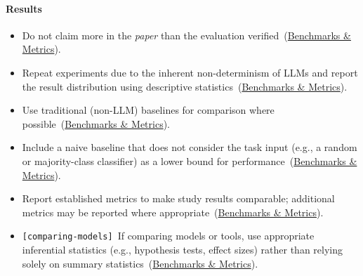\documentclass[smallextended]{svjour3}
\makeatletter
\newcommand{\must}{\textbf{must}\xspace}
\newcommand{\mustnot}{\textbf{must not}\xspace}
\newcommand{\should}{\textbf{should}\xspace}
\newcommand{\paper}{\emph{paper}\xspace}
\newcommand{\paper}{\emph{paper}\xspace}
\newcommand{\iconM}{\usebox{\iconMbox}\xspace}
\newcommand{\iconS}{\usebox{\iconSbox}\xspace}
\newcommand{\iconM}{●\xspace}
\newcommand{\iconS}{○\xspace}
\newcommand{\condition}[1]{\texttt{\small[#1]}\,}
\newcommand{\condition}[1]{@@cond:#1@@}
\newcommand{\refbenchmarks}{\hyperref[sec:use-suitable-baselines-benchmarks-and-metrics]{Benchmarks \& Metrics}}
\newcommand{\refbenchmarks}{\href{/guidelines/benchmarks-metrics/}{Benchmarks \& Metrics}}
\makeatother
\begin{document}
\begin{appendices}
\paragraph{\textbf{Results}}
\begin{itemize}[label={},leftmargin=*]
    \item \iconM Do not claim more in the \paper than the evaluation verified~(\refbenchmarks).
    \item \iconS Repeat experiments due to the inherent non-determinism of LLMs and report the result distribution using descriptive statistics~(\refbenchmarks).
    \item \iconS Use traditional (non-LLM) baselines for comparison where possible~(\refbenchmarks).
    \item \iconS Include a naive baseline that does not consider the task input (e.g., a random or majority-class classifier) as a lower bound for performance~(\refbenchmarks).
    \item \iconS Report established metrics to make study results comparable; additional metrics may be reported where appropriate~(\refbenchmarks).
    \item \iconS \condition{comparing-models} If comparing models or tools, use appropriate inferential statistics (e.g., hypothesis tests, effect sizes) rather than relying solely on summary statistics~(\refbenchmarks).
\end{itemize}


\end{appendices}
\end{document}
